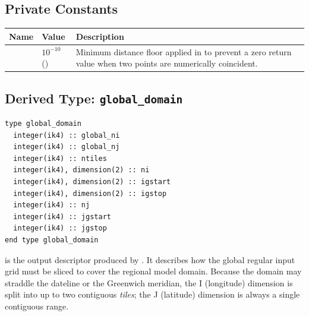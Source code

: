 \subsection{Private Constants}

\begin{longtable}{L{3cm} L{3cm} L{8cm}}
  \toprule
  \textbf{Name} & \textbf{Value} & \textbf{Description} \\
  \midrule
  \endhead
  \bottomrule
  \endfoot
   & $10^{-10}$ () &
    Minimum distance floor applied in  to prevent a zero
    return value when two points are numerically coincident. \\
\end{longtable}

\subsection{Derived Type: \texttt{global\_domain}}
\label{subsec:earth_globaldom}

\begin{lstlisting}
type global_domain
  integer(ik4) :: global_ni
  integer(ik4) :: global_nj
  integer(ik4) :: ntiles
  integer(ik4), dimension(2) :: ni
  integer(ik4), dimension(2) :: igstart
  integer(ik4), dimension(2) :: igstop
  integer(ik4) :: nj
  integer(ik4) :: jgstart
  integer(ik4) :: jgstop
end type global_domain
\end{lstlisting}

 is the output descriptor produced by .
It describes how the global regular input grid must be sliced to cover the
regional model domain. Because the domain may straddle the dateline or the
Greenwich meridian, the I (longitude) dimension is split into up to two
contiguous \emph{tiles}; the J (latitude) dimension is always a single
contiguous range.

